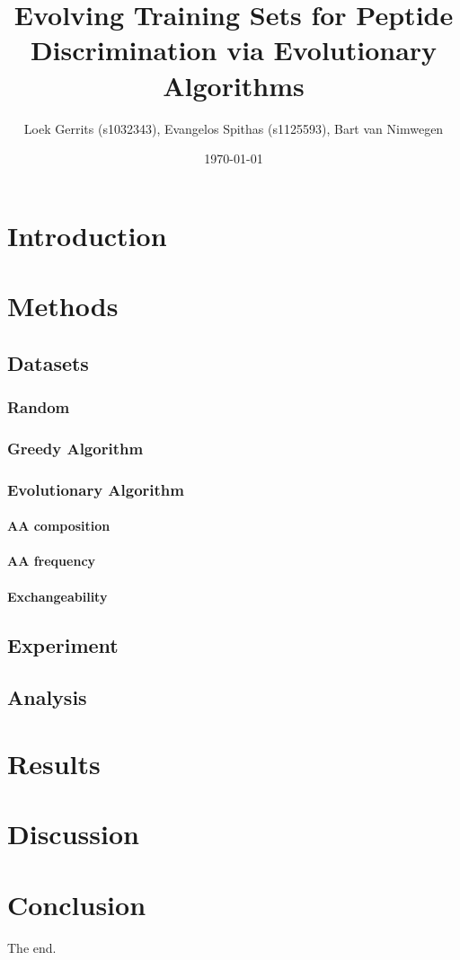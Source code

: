 \documentclass{article}
\title{Evolving Training Sets for Peptide Discrimination via Evolutionary Algorithms}
\author{Loek Gerrits (s1032343), Evangelos Spithas (s1125593), Bart van Nimwegen}
\date{\today}
\begin{document}
 

\maketitle

\section{Introduction}



\section{Methods}

\subsection{Datasets}

\subsubsection{Random}


\subsubsection{Greedy Algorithm}


\subsubsection{Evolutionary Algorithm}

\paragraph{AA composition}

\paragraph{AA frequency}

\paragraph{Exchangeability}


\subsection{Experiment}


\subsection{Analysis}


\section{Results}



\section{Discussion}



\section{Conclusion}

The end.

\printbibliography

\appendix
\end{document}
